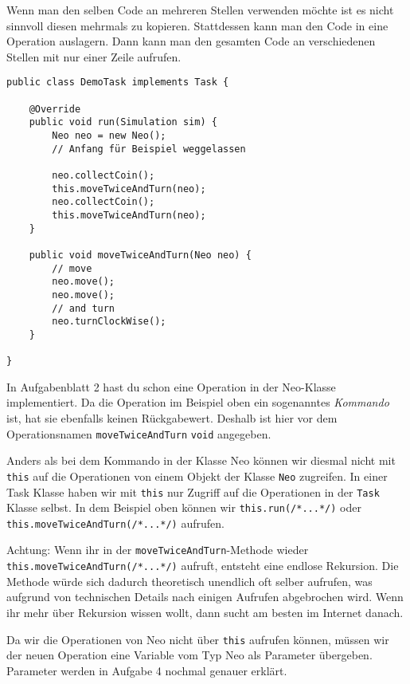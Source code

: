 \begin{Infobox}
	Wenn man den selben Code an mehreren Stellen verwenden möchte ist es nicht sinnvoll diesen mehrmals zu kopieren.
	Stattdessen kann man den Code in eine Operation auslagern.
	Dann kann man den gesamten Code an verschiedenen Stellen mit nur einer Zeile aufrufen.

	\begin{lstlisting}[xleftmargin=0.5cm]
public class DemoTask implements Task {

    @Override
    public void run(Simulation sim) {
        Neo neo = new Neo();
        // Anfang für Beispiel weggelassen

        neo.collectCoin();
        this.moveTwiceAndTurn(neo);
        neo.collectCoin();
        this.moveTwiceAndTurn(neo);
    }

    public void moveTwiceAndTurn(Neo neo) {
        // move
        neo.move();
        neo.move();
        // and turn
        neo.turnClockWise();
    }

}
	\end{lstlisting}

	In Aufgabenblatt 2 hast du schon eine Operation in der Neo-Klasse implementiert.
	Da die Operation im Beispiel oben ein sogenanntes \textit{Kommando} ist, hat sie ebenfalls keinen Rückgabewert.
	Deshalb ist hier vor dem Operationsnamen \lstinline{moveTwiceAndTurn} \lstinline{void} angegeben.

	Anders als bei dem Kommando in der Klasse Neo können wir diesmal nicht mit \lstinline{this} auf die Operationen von einem Objekt der Klasse \lstinline{Neo} zugreifen.
	In einer Task Klasse haben wir mit \lstinline{this} nur Zugriff auf die Operationen in der \lstinline{Task} Klasse selbst.
	In dem Beispiel oben können wir \lstinline{this.run(/*...*/)} oder \lstinline{this.moveTwiceAndTurn(/*...*/)} aufrufen.

	Achtung: Wenn ihr in der \lstinline{moveTwiceAndTurn}-Methode wieder \lstinline{this.moveTwiceAndTurn(/*...*/)} aufruft, entsteht eine endlose Rekursion.
	Die Methode würde sich dadurch theoretisch unendlich oft selber aufrufen, was aufgrund von technischen Details nach einigen Aufrufen abgebrochen wird.
	Wenn ihr mehr über Rekursion wissen wollt, dann sucht am besten im Internet danach.

	Da wir die Operationen von Neo nicht über \lstinline{this} aufrufen können, müssen wir der neuen Operation eine Variable vom Typ Neo als Parameter übergeben.
	Parameter werden in Aufgabe 4 nochmal genauer erklärt.
\end{Infobox}


